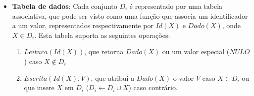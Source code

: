 \documentclass[11pt,twoside,a4paper]{book}
\begin{document}
\begin{itemize}

\item \textbf{Tabela de dados}: Cada conjunto \(D_i\) é representado por uma tabela associativa, que pode ser visto como uma função que associa um identificador a um valor, representados respectivamente por \(Id(X)\) e \(Dado(X)\), onde \(X \in D_i\). Esta tabela suporta as seguintes operações:

\begin{enumerate}
    \item $Leitura(Id(X))$, que retorna $Dado(X)$ ou um valor especial ($NULO$) caso $X \notin D_i$

    \item $Escrita(Id(X), V)$, que atribui a $Dado(X)$ o valor $V$ caso $X \in D_i$ ou que insere $X$ em $D_i$ ($D_i \gets D_i \cup X$) caso contrário. 
\end{enumerate}
 




\end{itemize}
\end{document}
